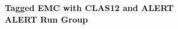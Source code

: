 \begin{titlepage}
     \begin{center}
       \vspace*{-1.5cm}
        \\
       \vspace*{0.2cm}
        \\
       \vspace*{2.3cm}
       \noindent \Huge \textbf{Tagged EMC with CLAS12 and ALERT} \\
       \vspace*{0.6cm}
       \noindent \Large \textbf{ALERT Run Group} \\
       \vspace*{0.7cm}
     \end{center}
   

\end{titlepage}

